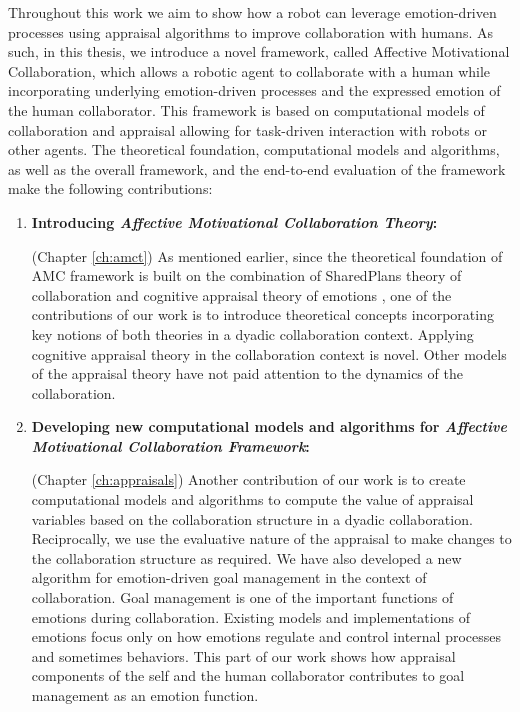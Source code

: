 \documentclass[12pt]{report}
\begin{document}
Throughout this work we aim to show how a robot can leverage emotion-driven
processes using appraisal algorithms to improve collaboration with humans. As
such, in this thesis, we introduce a novel framework, called Affective
Motivational Collaboration, which allows a robotic agent to collaborate with a
human while incorporating underlying emotion-driven processes and the expressed
emotion of the human collaborator. This framework is based on computational
models of collaboration and appraisal allowing for task-driven interaction with
robots or other agents. The theoretical foundation, computational models and
algorithms, as well as the overall framework, and the end-to-end evaluation of
the framework make the following contributions:

\begin{enumerate}
  \item \textbf{Introducing \textit{Affective Motivational Collaboration Theory}:}
    
  	(Chapter \ref{ch:amct}) As mentioned earlier, since the theoretical
  	foundation of AMC framework is built on the combination of SharedPlans
  	theory of collaboration \cite{grosz:plans-discourse} and cognitive appraisal
  	theory of emotions \cite{marsella:ema-process-model}
  	\cite{scherer:appraisal-processes}, one of the contributions of our work is
  	to introduce theoretical concepts incorporating key notions of both theories
  	in a dyadic collaboration context. Applying cognitive appraisal theory in the
  	collaboration context is novel. Other models of the appraisal theory have not
  	paid attention to the dynamics of the collaboration.
	
  \item \textbf{Developing new computational models and algorithms for
  \textit{Affective Motivational Collaboration Framework}:}
  
	(Chapter \ref{ch:appraisals}) Another contribution of our work is to create
	computational models and algorithms to compute the value of appraisal variables
	based on the collaboration structure in a dyadic collaboration. Reciprocally,
	we use the evaluative nature of the appraisal to make changes to the
	collaboration structure as required. We have also developed a new algorithm for
	emotion-driven goal management in the context of collaboration. Goal management
	is one of the important functions of emotions during collaboration. Existing
	models and implementations of emotions focus only on how emotions regulate and
	control internal processes and sometimes behaviors. This part of our work shows
	how appraisal components of the self and the human collaborator contributes to
	goal management as an emotion function.
  

\end{enumerate}
\end{document}

